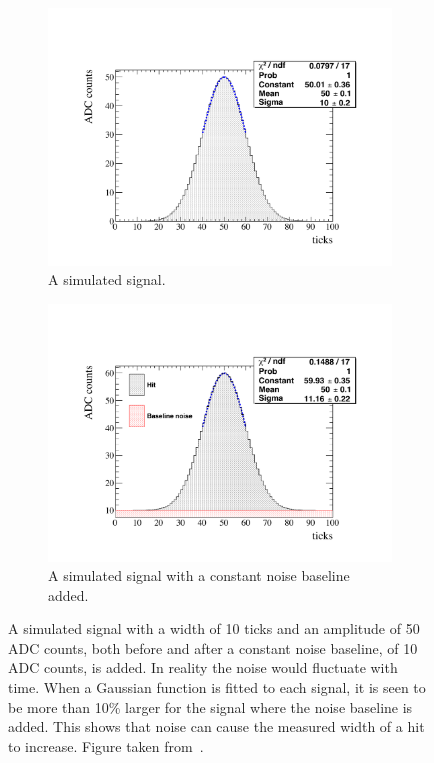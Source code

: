 \begin{figure}[h!]
  \centering
  \begin{subfigure}{0.45\textwidth}
    \centering
    \includegraphics[width=\textwidth]{ToyGauss_Raw}
    \caption{A simulated signal.}
  \end{subfigure}
  \hspace{0.08\textwidth}
  \begin{subfigure}{0.45\textwidth}
    \centering
    \includegraphics[width=\textwidth]{ToyGauss_Noise}
    \caption{A simulated signal with a constant noise baseline added.}
  \end{subfigure}
  \caption[The effect of adding a noise baseline to a hit]
          {A simulated signal with a width of 10 ticks and an amplitude of 50 ADC counts, both before and after a constant noise baseline, of 10 ADC counts, is added. In reality the noise would fluctuate with time. When a Gaussian function is fitted to each signal, it is seen to be more than 10\% larger for the signal where the noise baseline is added. This shows that noise can cause the measured width of a hit to increase. Figure taken from~\citep{DomSeptMeeting}.}
          \label{fig:DomsHitModel}
\end{figure}  


